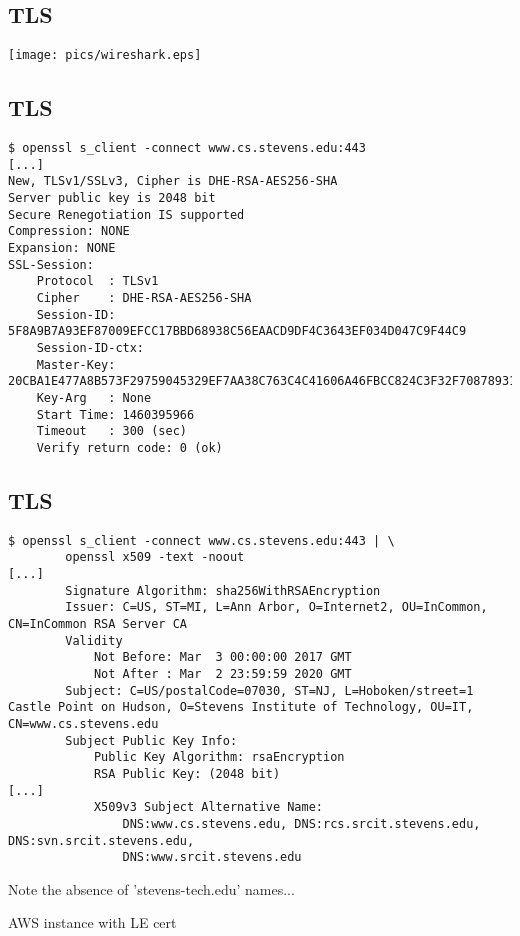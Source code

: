 \documentclass[xga]{xdvislides}
\begin{document}
\subsection{TLS}
\begin{center}
	\texttt{[image: pics/wireshark.eps]}
\end{center}

\subsection{TLS}
\begin{verbatim}
$ openssl s_client -connect www.cs.stevens.edu:443
[...]
New, TLSv1/SSLv3, Cipher is DHE-RSA-AES256-SHA
Server public key is 2048 bit
Secure Renegotiation IS supported
Compression: NONE
Expansion: NONE
SSL-Session:
    Protocol  : TLSv1
    Cipher    : DHE-RSA-AES256-SHA
    Session-ID: 5F8A9B7A93EF87009EFCC17BBD68938C56EAACD9DF4C3643EF034D047C9F44C9
    Session-ID-ctx: 
    Master-Key: 20CBA1E477A8B573F29759045329EF7AA38C763C4C41606A46FBCC824C3F32F708789311E7B4275470E35CF09518FDCD
    Key-Arg   : None
    Start Time: 1460395966
    Timeout   : 300 (sec)
    Verify return code: 0 (ok)
\end{verbatim}

\subsection{TLS}
\smallish
\begin{verbatim}
$ openssl s_client -connect www.cs.stevens.edu:443 | \
        openssl x509 -text -noout
[...]
        Signature Algorithm: sha256WithRSAEncryption
        Issuer: C=US, ST=MI, L=Ann Arbor, O=Internet2, OU=InCommon, CN=InCommon RSA Server CA
        Validity
            Not Before: Mar  3 00:00:00 2017 GMT
            Not After : Mar  2 23:59:59 2020 GMT
        Subject: C=US/postalCode=07030, ST=NJ, L=Hoboken/street=1 Castle Point on Hudson, O=Stevens Institute of Technology, OU=IT, CN=www.cs.stevens.edu
        Subject Public Key Info:
            Public Key Algorithm: rsaEncryption
            RSA Public Key: (2048 bit)
[...]
            X509v3 Subject Alternative Name: 
                DNS:www.cs.stevens.edu, DNS:rcs.srcit.stevens.edu, DNS:svn.srcit.stevens.edu,
                DNS:www.srcit.stevens.edu
\end{verbatim}
\Normalsize
Note the absence of 'stevens-tech.edu' names...

AWS instance with LE cert

% 
% 
% 
% 
% 
 
\end{document}
